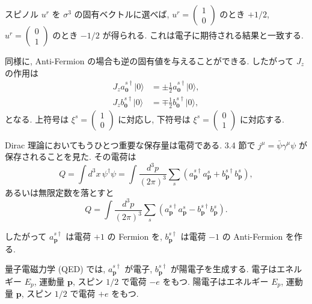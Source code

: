 \documentclass[a4paper,12pt]{article}
\begin{document}
スピノル $u^r$ を $\sigma^3$ の固有ベクトルに選べば,
$u^r = \begin{pmatrix}1 \\ 0\end{pmatrix}$ のとき $+1/2$, 
$u^r = \begin{pmatrix}0 \\ 1\end{pmatrix}$ のとき $-1/2$ が得られる.  
これは電子に期待される結果と一致する.

同様に, Anti-Fermion の場合も逆の固有値を与えることができる.  
したがって $J_z$ の作用は
\begin{align}
J_z a^{s\dagger}_{\mathbf{0}}|0\rangle &= \pm \tfrac{1}{2} a^{s\dagger}_{\mathbf{0}}|0\rangle, \\
J_z b^{s\dagger}_{\mathbf{0}}|0\rangle &= \mp \tfrac{1}{2} b^{s\dagger}_{\mathbf{0}}|0\rangle,
\tag{3.112}
\end{align}
となる. 上符号は $\xi^s = \begin{pmatrix}1\\0\end{pmatrix}$ に対応し, 下符号は $\xi^s = \begin{pmatrix}0\\1\end{pmatrix}$ に対応する.

Dirac 理論においてもうひとつ重要な保存量は電荷である.  
3.4 節で $j^\mu = \bar{\psi}\gamma^\mu \psi$ が保存されることを見た.  
その電荷は
\begin{equation}
Q = \int d^3x \, \psi^\dagger \psi 
= \int \frac{d^3p}{(2\pi)^3} \sum_s \left( a^{s\dagger}_{\mathbf{p}}a^s_{\mathbf{p}} + b^{s\dagger}_{\mathbf{p}} b^s_{\mathbf{p}} \right),
\end{equation}
あるいは無限定数を落とすと
\begin{equation}
Q = \int \frac{d^3p}{(2\pi)^3} \sum_s \left( a^{s\dagger}_{\mathbf{p}}a^s_{\mathbf{p}} - b^{s\dagger}_{\mathbf{p}} b^s_{\mathbf{p}} \right).
\tag{3.113}
\end{equation}

したがって $a^{s\dagger}_{\mathbf{p}}$ は電荷 $+1$ の Fermion を, 
$b^{s\dagger}_{\mathbf{p}}$ は電荷 $-1$ の Anti-Fermion を作る.  

量子電磁力学 (QED) では, $a^{s\dagger}_{\mathbf{p}}$ が電子, $b^{s\dagger}_{\mathbf{p}}$ が陽電子を生成する.  
電子はエネルギー $E_p$, 運動量 $\mathbf{p}$, スピン $1/2$ で電荷 $-e$ をもつ.  
陽電子はエネルギー $E_p$, 運動量 $\mathbf{p}$, スピン $1/2$ で電荷 $+e$ をもつ.  
\end{document}
